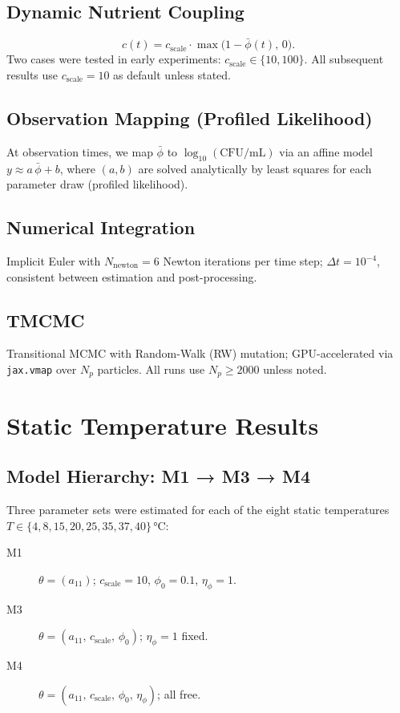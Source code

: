 \documentclass[11pt,a4paper]{article}
\begin{document}
\subsection{Dynamic Nutrient Coupling}
\begin{equation}
    c(t) = c_{\mathrm{scale}}\cdot\max\!\bigl(1-\bar\phi(t),\,0\bigr).
\end{equation}
Two cases were tested in early experiments: $c_{\mathrm{scale}}\in\{10,100\}$.
All subsequent results use $c_{\mathrm{scale}}=10$ as default unless stated.

\subsection{Observation Mapping (Profiled Likelihood)}
At observation times, we map $\bar\phi$ to $\log_{10}(\mathrm{CFU/mL})$ via an
affine model $y \approx a\,\bar\phi+b$, where $(a,b)$ are solved analytically by
least squares for each parameter draw (profiled likelihood).

\subsection{Numerical Integration}
Implicit Euler with $N_{\mathrm{newton}}=6$ Newton iterations per time step;
$\Delta t=10^{-4}$, consistent between estimation and post-processing.

\subsection{TMCMC}
Transitional MCMC \cite{ching2007} with Random-Walk (RW) mutation; GPU-accelerated via
\texttt{jax.vmap} over $N_p$ particles. All runs use $N_p\ge 2000$ unless noted.

\section{Static Temperature Results}
\subsection{Model Hierarchy: M1 → M3 → M4}
Three parameter sets were estimated for each of the eight static temperatures
$T\in\{4,8,15,20,25,35,37,40\}$\,°C:

\begin{description}
  \item[M1] $\theta=(a_{11})$; $c_{\mathrm{scale}}=10$, $\phi_0=0.1$, $\eta_\phi=1$.
  \item[M3] $\theta=(a_{11},\,c_{\mathrm{scale}},\,\phi_0)$; $\eta_\phi=1$ fixed.
  \item[M4] $\theta=(a_{11},\,c_{\mathrm{scale}},\,\phi_0,\,\eta_\phi)$; all free.
\end{description}
\end{document}

